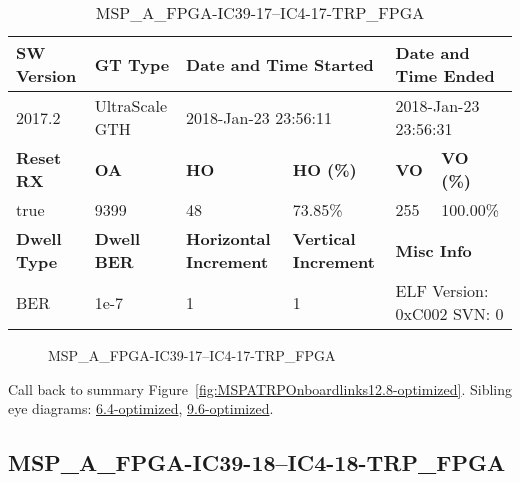 \begin{table}[h]
\centering
\caption{MSP\_A\_FPGA-IC39-17--IC4-17-TRP\_FPGA}
\label{tab:MSPAFPGAIC3917IC417TRPFPGA12.8-optimized}
\begin{tabular}{@{}|l|l|l|l|l|l|@{}}
\toprule
\textbf{SW Version}                & \textbf{GT Type}   & \multicolumn{2}{l|}{\textbf{Date and Time Started}}            & \multicolumn{2}{l|}{\textbf{Date and Time Ended}}        \\ \midrule
2017.2                       & UltraScale GTH          & \multicolumn{2}{l|}{2018-Jan-23 23:56:11}                   & \multicolumn{2}{l|}{2018-Jan-23 23:56:31}               \\ \midrule
\textbf{Reset RX}                  & \textbf{OA} & \textbf{HO}   & \textbf{HO (\%)} & \textbf{VO} & \textbf{VO (\%)} \\ \midrule
true & 9399        & 48          & 73.85\%        & 255        & 100.00\%       \\ \midrule
\textbf{Dwell Type}                & \textbf{Dwell BER} & \textbf{Horizontal Increment} & \textbf{Vertical Increment}    & \multicolumn{2}{l|}{\textbf{Misc Info}}                  \\ \midrule
BER                            & 1e-7        & 1        & 1           & \multicolumn{2}{l|}{ELF Version: 0xC002 SVN: 0}                         \\ \bottomrule
\end{tabular}
\end{table}

\begin{figure}[h]
\caption{MSP\_A\_FPGA-IC39-17--IC4-17-TRP\_FPGA} \label{fig:MSPAFPGAIC3917IC417TRPFPGA12.8-optimized}
\end{figure}

Call back to summary Figure~\ref{fig:MSPATRPOnboardlinks12.8-optimized}.
Sibling eye diagrams: \hyperref[sec:MSPAFPGAIC3917IC417TRPFPGA6.4-optimized]{6.4-optimized}, \hyperref[sec:MSPAFPGAIC3917IC417TRPFPGA9.6-optimized]{9.6-optimized}.

\clearpage
\newpage


\subsection{MSP\_A\_FPGA-IC39-18--IC4-18-TRP\_FPGA}\label{sec:MSPAFPGAIC3918IC418TRPFPGA12.8-optimized}

